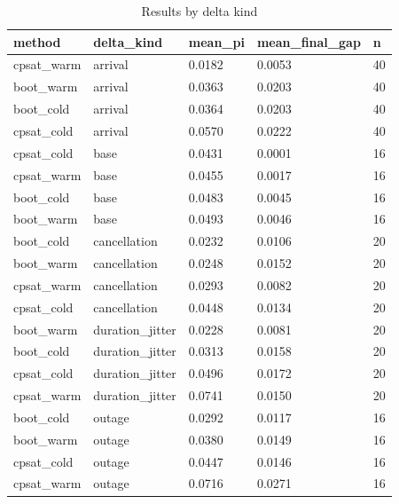 \begin{table}[t]
\centering
\begin{tabular}{lllll}
\toprule
method & delta\_kind & mean\_pi & mean\_final\_gap & n \\
\midrule
cpsat\_warm & arrival & 0.0182 & 0.0053 & 40 \\
boot\_warm & arrival & 0.0363 & 0.0203 & 40 \\
boot\_cold & arrival & 0.0364 & 0.0203 & 40 \\
cpsat\_cold & arrival & 0.0570 & 0.0222 & 40 \\
cpsat\_cold & base & 0.0431 & 0.0001 & 16 \\
cpsat\_warm & base & 0.0455 & 0.0017 & 16 \\
boot\_cold & base & 0.0483 & 0.0045 & 16 \\
boot\_warm & base & 0.0493 & 0.0046 & 16 \\
boot\_cold & cancellation & 0.0232 & 0.0106 & 20 \\
boot\_warm & cancellation & 0.0248 & 0.0152 & 20 \\
cpsat\_warm & cancellation & 0.0293 & 0.0082 & 20 \\
cpsat\_cold & cancellation & 0.0448 & 0.0134 & 20 \\
boot\_warm & duration\_jitter & 0.0228 & 0.0081 & 20 \\
boot\_cold & duration\_jitter & 0.0313 & 0.0158 & 20 \\
cpsat\_cold & duration\_jitter & 0.0496 & 0.0172 & 20 \\
cpsat\_warm & duration\_jitter & 0.0741 & 0.0150 & 20 \\
boot\_cold & outage & 0.0292 & 0.0117 & 16 \\
boot\_warm & outage & 0.0380 & 0.0149 & 16 \\
cpsat\_cold & outage & 0.0447 & 0.0146 & 16 \\
cpsat\_warm & outage & 0.0716 & 0.0271 & 16 \\
\bottomrule
\end{tabular}
\caption{Results by delta kind}
\label{tab:by-delta}
\end{table}
